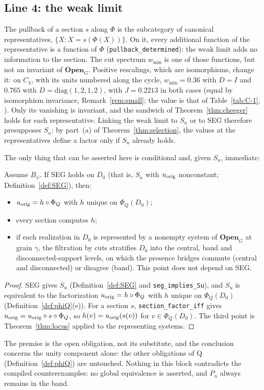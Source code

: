 \subsection{Line 4: the weak limit}\label{sec:l4}
The pullback of a section $s$ along $\Phi$ is the subcategory of canonical representatives, $\{X: X=s(\Phi(X))\}$. On it, every additional function of the representative is a function of $\Phi$ (\texttt{pullback\_determined}): the weak limit adds no information to the section. The cut spectrum $w_{\min}$ is one of those functions, but not an invariant of $\mathbf{Open}_G$. Positive rescalings, which are isomorphisms, change it: on $C_4$, with its units numbered along the cycle, $w_{\min}=0.36$ with $D=I$ and $0.765$ with $D=\mathrm{diag}(1,2,1,2)$, with $J=0.2213$ in both cases (equal by isomorphism invariance, Remark~\ref{rem:small}; the value is that of Table~\ref{tab:C-1}, \stN). Only its vanishing is invariant, and the sandwich of Theorem~\ref{thm:cheeger} holds for each representative. Linking the weak limit to $S_u$ or to SEG therefore presupposes $S_u$: by part~(a) of Theorem~\ref{thm:selection}, the values at the representatives define a factor only if $S_u$ already holds.

The only thing that can be asserted here is conditional and, given $S_u$, immediate:
\begin{proposition}\label{prop:conditional}
Assume $B_\psi$. If SEG holds on $D_0$ (that is, $S_u$ with $u_{\rm orig}$ nonconstant; Definition~\ref{def:SEG}), then:
\begin{itemize}
\item $u_{\rm orig}=h\circ\Phi_Q$ with $h$ unique on $\Phi_Q(D_0)$;
\item every section computes $h$;
\item if each realization in $D_0$ is represented by a nonempty system of $\mathbf{Open}_G$ at grain $\gamma$, the filtration by cuts stratifies $D_0$ into the central, band and disconnected-support levels, on which the presence bridges commute (central and disconnected) or disagree (band). This point does not depend on SEG.
\end{itemize}
\end{proposition}
\begin{proof}
SEG gives $S_u$ (Definition~\ref{def:SEG} and \texttt{seg\_implies\_Su}), and $S_u$ is equivalent to the factorization $u_{\rm orig}=h\circ\Phi_Q$ with $h$ unique on $\Phi_Q(D_0)$ (Definition~\ref{def:phiQ}(e)). For a section $s$, \texttt{section\_factor\_iff} gives $u_{\rm orig}=u_{\rm orig}\circ s\circ\Phi_Q$, so $h(v)=u_{\rm orig}(s(v))$ for $v\in\Phi_Q(D_0)$. The third point is Theorem~\ref{thm:locus} applied to the representing systems.
\end{proof}
The premise is the open obligation, not its substitute, and the conclusion concerns the unity component alone: the other obligations of Q (Definition~\ref{def:phiQ}) are untouched. Nothing in this block contradicts the compiled counterexamples: no global equivalence is asserted, and $P_n$ always remains in the band.
